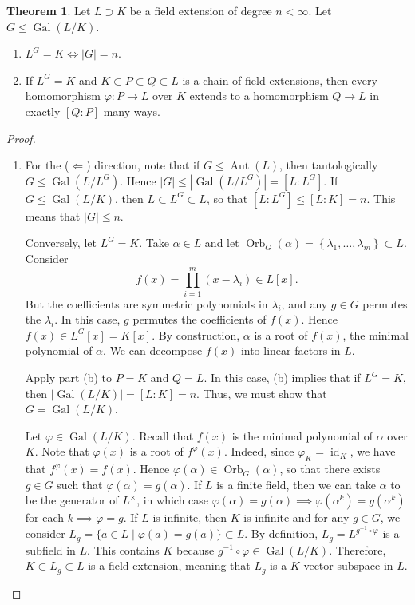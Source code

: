 \documentclass[10pt,letterpaper,cm]{nupset}
\theoremstyle{definition}
\theoremstyle{theorem}
\newtheorem{theorem}[definition]{Theorem}
\theoremstyle{remark}
\newcommand{\1}{\mathbf{1}}
\newcommand{\0}{\vec 0}
\DeclareMathOperator{\id}{id}
\DeclareMathOperator{\gal}{Gal}
\DeclareMathOperator{\aut}{Aut}
\DeclareMathOperator{\orb}{Orb}
\begin{document}
\begin{theorem}
Let $L \supset K$ be a field extension of degree $n<\infty$. Let $G \leq  \gal(L/K)$.
\begin{enumerate}[label=(\alph*)]
\item $L^G = K \iff \left\lvert{G}\right\rvert = n$.
\item  If $L^G = K$ and $K \subset P \subset Q \subset L$ is a chain of field extensions, then every homomorphism $\varphi : P \to L$ over $K$ extends to a homomorphism $Q \to L$ in exactly $[Q:P]$ many ways. 
\end{enumerate}
\end{theorem}
\begin{proof} $ $
\begin{enumerate}[label=(\alph*)]
\item For the ($\Longleftarrow$) direction, note that if $G \leq \aut(L)$, then tautologically $G \leq \gal(L/L^G)$. Hence $\left\lvert{G}\right\rvert \leq \left\lvert{\gal(L/L^G)}\right\rvert = \left[L: L^G\right]$. If $G \leq \gal(L/K)$, then $L \subset L^G \subset L$, so that $\left[L:L^G\right]\leq [L:K] =n$. This means that $\left\lvert{G}\right\rvert\leq n$.

Conversely, let $L^G =K$.  Take $\alpha \in L$ and let $\orb_G(\alpha) = \left\{\lambda_1, \ldots, \lambda_m\right\} \subset L$. Consider $$f(x) = \prod_{i=1}^m (x-\lambda_i) \in L[x].$$ But the coefficients are symmetric polynomials in $\lambda_i$, and any $g\in G$ permutes the $\lambda_i$. In this case, $g$ permutes the coefficients of $f(x)$. Hence $f(x) \in L^G[x] = K[x]$. By construction, $\alpha$ is a root of $f(x)$, the minimal polynomial of $\alpha$.  We can decompose $f(x)$ into linear factors in $L$.

Apply part (b) to $P = K$ and $Q=L$. In this case, (b) implies that if $L^G=K$, then $\left\lvert{\gal(L/K)}\right\rvert = [L:K]=n$. Thus, we must show that $G = \gal(L/K)$.

Let $\varphi \in \gal(L/K)$. Recall that $f(x)$ is the minimal polynomial of $\alpha$ over $K$. Note that $\varphi(x)$ is a root of $f^{\varphi}(x)$. Indeed, since $\varphi_K = \id_K$, we have that $f^{\varphi}(x) = f(x)$. Hence $\varphi(\alpha) \in \orb_G(\alpha)$, so that there exists $g\in G$ such that $\varphi(\alpha) = g(\alpha)$. If $L$ is a finite field, then we can take $\alpha$ to be the generator of $L^{\times}$, in which case $\varphi(\alpha) = g(\alpha) \implies \varphi(\alpha^k)= g(\alpha^k)$ for each $k \implies \varphi = g.$ If $L$ is infinite, then $K$ is infinite and for any $g\in G$, we consider $L_g = \{a\in L \mid \varphi(a) = g(a)\}\subset L$. By definition, $L_g = L^{g^{-1}\circ \varphi}$ is a subfield in $L$. This contains $K$ because $g^{-1}\circ \varphi \in \gal(L/K)$. Therefore, $K\subset L_g \subset L$ is a field extension, meaning that $L_g$ is a $K$-vector subspace in $L$.


\end{enumerate}
\end{proof}
\end{document}
